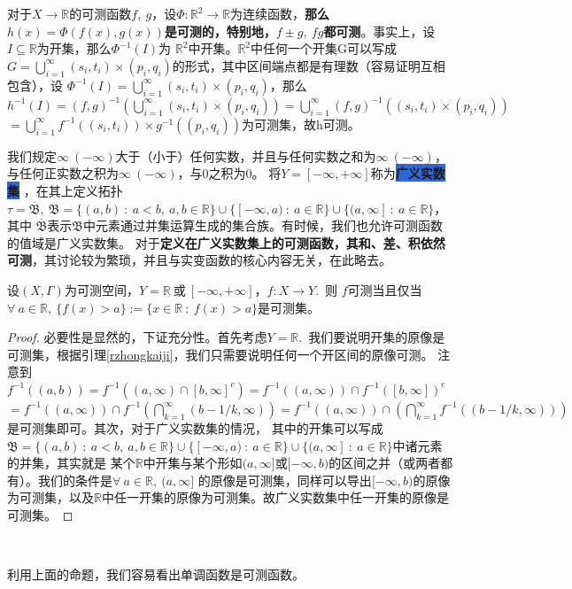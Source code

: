 \documentclass[color=green,thmcnt=section,lang=cn,12pt]{elegantbook}
\makeatletter
\numberwithin{equation}{section}%
\numberwithin{figure}{section}%
\newcommand{\RR}{\mathbb{R}}
\newcommand{\any}{\forall \ }
\newcommand{\cu}[1]{\bigcup_{#1=1}^{\infty}} %
\newcommand{\ci}[1]{\bigcap_{#1=1}^{\infty}} %
\newcommand{\bi}[2]{\colorbox{highlight}{\textbf{\textcolor[RGB]{14,14,94}{#1}}}\index{#2@#1} \label{#2}} %
\makeatother
\begin{document}
对于$X\to \RR$的可测函数$f,\ g$，设$\Phi:\RR^2\to \RR$为连续函数，\textbf{那么
$h(x)=\Phi(f(x),g(x))$是可测的，特别地，$f \pm g,\ fg$都可测}。事实上，设$I\subseteq \RR$为开集，那么$\Phi^{-1}(I)$为
$\RR^2$中开集。$\RR^2$中任何一个开集G可以写成$G=\cu{i}(s_i,t_i)\times (p_i,q_i)$的形式，其中区间端点都是有理数（容易证明互相包含），设
$\Phi^{-1}(I)=\cu{i}(s_i,t_i)\times (p_i,q_i)$，那么$h^{-1}(I)=(f,g)^{-1}(\cu{i}(s_i,t_i)\times (p_i,q_i))=\cu{i}(f,g)^{-1}((s_i,t_i)\times (p_i,q_i))$
$=\cu{i}f^{-1}((s_i,t_i))\times g^{-1}((p_i,q_i))$为可测集，故h可测。


我们规定$\infty\ (-\infty)$大于（小于）任何实数，并且与任何实数之和为$\infty\ (-\infty)$，与任何正实数之积为$\infty\ (-\infty)$，与0之积为0。
将$Y=[-\infty,+\infty]$称为\bi{广义实数集}{guangyishishuji}，在其上定义拓扑$\tau=\overline{\mathfrak{B}},\ \mathfrak{B}=\{(a,b)\ :\ a<b,\ a,b\in \RR\}\cup \{[-\infty,a)\ :\ a\in \RR\}\cup\{(a,\infty]\ :\ a\in \RR\}$，其中
$\overline{\mathfrak{B}}$表示${\mathfrak{B}}$中元素通过并集运算生成的集合族。有时候，我们也允许可测函数的值域是广义实数集。
对于\textbf{定义在广义实数集上的可测函数，其和、差、积依然可测}，其讨论较为繁琐，并且与实变函数的核心内容无关，在此略去。
\ \\


\begin{proposition}[可测函数的刻画]\label{kecehanshudekehua}
    设$(X,\Gamma)$为可测空间，$Y=\RR\ \mbox{或}\ [-\infty,+\infty]$，$f:X\to Y$.\ 则
    $f$可测当且仅当$\any a \in \RR,\ \{f(x)>a\}:=\{x\in \RR\ :\ f(x)>a\}$是可测集。
\end{proposition}
\begin{proof}
    必要性是显然的，下证充分性。首先考虑$Y=\RR$.\ 我们要说明开集的原像是可测集，根据引理\ref{rzhongkaiji}，我们只需要说明任何一个开区间的原像可测。
注意到$f^{-1}((a,b))=f^{-1}((a,\infty)\cap[b,\infty]^c)=f^{-1}((a,\infty))\cap f^{-1}([b,\infty])^c$
$=f^{-1}((a,\infty))\cap f^{-1}(\ci{k}(b-1/k,\infty))=f^{-1}((a,\infty))\cap (\ci{k}f^{-1}((b-1/k,\infty)))$是可测集即可。其次，对于广义实数集的情况，
其中的开集可以写成$ \mathfrak{B}=\{(a,b)\ :\ a<b,\ a,b\in \RR\}\cup \{[-\infty,a)\ :\ a\in \RR\}\cup\{(a,\infty]\ :\ a\in \RR\}$中诸元素的并集，其实就是
某个$\RR$中开集与某个形如$(a,\infty]$或$[-\infty,b)$的区间之并（或两者都有）。我们的条件是$\any a \in \RR,\ (a,\infty]$
的原像是可测集，同样可以导出$[-\infty,b)$的原像为可测集，以及$\RR$中任一开集的原像为可测集。故广义实数集中任一开集的原像是可测集。
\end{proof}
\ 

利用上面的命题，我们容易看出单调函数是可测函数。
\end{document}
